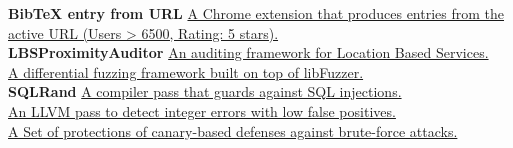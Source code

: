 
\begin{cvparagraph}

\textbf{BibTeX entry from URL} \hspace*{2pt} \href{https://chrome.google.com/webstore/detail/bibtex-entry-from-url/mgpmgkhhbjgkpnanlmlhibjfgpdpgjec} {A Chrome extension that produces  entries from the active URL (Users > 6500, Rating: 5 stars).}\\
\textbf{LBSProximityAuditor} \hspace*{7pt} \href{https://github.com/nettrino/LBSProximityAuditor}{An auditing framework for Location Based Services.}\\
\textbf{\nezha} \hspace*{69pt} \href{https://github.com/nezha-dt/nezha}
    {A differential fuzzing framework built on top of libFuzzer.}\\
\textbf{SQLRand} \hspace*{58pt}
\href{https://github.com/nettrino/SQLRand}{A compiler pass that guards against SQL injections.}\\
\textbf{\intflow} \hspace*{59pt} \href{https://github.com/nettrino/IntFlow}{An LLVM pass to detect integer errors with low false positives.}\\
\textbf{\dynaguard} \hspace*{46pt}
\href{https://github.com/nettrino/DynaGuard}{A Set of protections of canary-based defenses against brute-force attacks.}
\end{cvparagraph}
